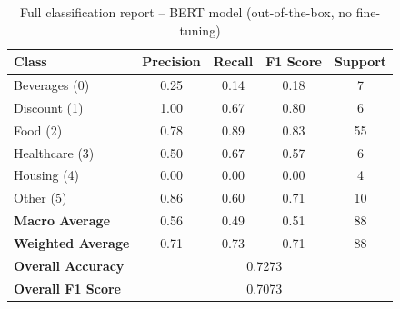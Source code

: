 \documentclass{SGGW-thesis-EN}
\begin{document}
\begin{table}[h]
  \centering
  \caption{Full classification report – BERT model (out-of-the-box, no fine-tuning)}
  \label{appendix:bert-report-outofbox}
  \begin{tabularx}{\textwidth}{lcccc}
    \toprule
    \textbf{Class} & \textbf{Precision} & \textbf{Recall} & \textbf{F1 Score} & \textbf{Support} \\
    \midrule
    Beverages (0)     & 0.25 & 0.14 & 0.18 & 7 \\
    Discount (1)      & 1.00 & 0.67 & 0.80 & 6 \\
    Food (2)          & 0.78 & 0.89 & 0.83 & 55 \\
    Healthcare (3)    & 0.50 & 0.67 & 0.57 & 6 \\
    Housing (4)       & 0.00 & 0.00 & 0.00 & 4 \\
    Other (5)         & 0.86 & 0.60 & 0.71 & 10 \\
    \midrule
    \textbf{Macro Average}   & 0.56 & 0.49 & 0.51 & 88 \\
    \textbf{Weighted Average}& 0.71 & 0.73 & 0.71 & 88 \\
    \textbf{Overall Accuracy}& \multicolumn{4}{c}{0.7273} \\
    \textbf{Overall F1 Score}& \multicolumn{4}{c}{0.7073} \\
    \bottomrule
  \end{tabularx}
\end{table}
\renewcommand{\bibname}{Bibliography}

\printbibliography

\beforelastpage
\end{document}
